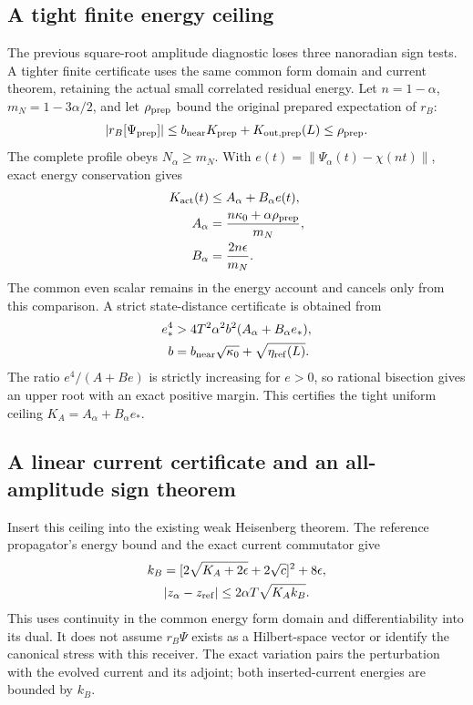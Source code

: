 \subsection{A tight finite energy ceiling}
The previous square-root amplitude diagnostic loses three nanoradian sign
tests. A tighter finite certificate uses the same common form domain and
current theorem, retaining the actual small correlated residual energy.
Let $n=1-\alpha$, $m_N=1-3\alpha/2$, and let
$\rho_{\rm prep}$ bound the original prepared expectation of $r_B$:
\[
 |r_B[\Psi_{\rm prep}]|\le b_{\rm near}K_{\rm prep}
                  +K_{{\rm out},\rm prep}(L)\le\rho_{\rm prep}.
\]
The complete profile obeys $N_\alpha\ge m_N$. With
$e(t)=\|\Psi_\alpha(t)-\chi(nt)\|$, exact energy conservation gives
\[
 \begin{aligned}
 K_{\rm act}(t)&\le A_\alpha+B_\alpha e(t),\\
 A_\alpha&=\frac{n\kappa_0+\alpha\rho_{\rm prep}}{m_N},\\
 B_\alpha&=\frac{2n\epsilon}{m_N}.
 \end{aligned}
\]
The common even scalar remains in the energy account and cancels only from
this comparison. A strict state-distance certificate is obtained from
\[
 \begin{aligned}
 e_*^4&>4T^2\alpha^2 b^2(A_\alpha+B_\alpha e_*),\\
 b&=b_{\rm near}\sqrt{\kappa_0}+\sqrt{\eta_{\rm ref}(L)}.
 \end{aligned}
\]
The ratio $e^4/(A+Be)$ is strictly increasing for $e>0$, so rational bisection
gives an upper root with an exact positive margin. This certifies the tight
uniform ceiling $K_A=A_\alpha+B_\alpha e_*$.

\subsection{A linear current certificate and an all-amplitude sign theorem}
Insert this ceiling into the existing weak Heisenberg theorem. The
reference propagator's energy bound and the exact current commutator give
\[
 \begin{gathered}
 k_B=[2\sqrt{K_A+2\epsilon}+2\sqrt c]^2+8\epsilon,\\
 |z_\alpha-z_{\rm ref}|\le2\alpha T\sqrt{K_Ak_B}.
 \end{gathered}
\]
This uses continuity in the common energy form domain and differentiability
into its dual. It does not assume $r_B\Psi$ exists as a Hilbert-space vector
or identify the canonical stress with this receiver. The exact variation
pairs the perturbation with the evolved current and its adjoint; both
inserted-current energies are bounded by $k_B$.

